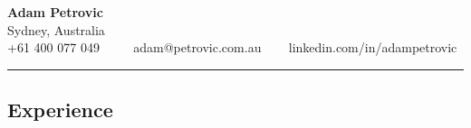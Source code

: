 \documentclass[11pt,letterpaper]{article}
\begin{document}
\begin{center}
	{\LARGE \textbf{Adam Petrovic}}\\
        \vspace{0.10cm}
	Sydney, Australia
	\vspace{0.20cm}
	\\
	\raisebox{-0.1\height} {\Large \faPhoneSquare} +61 400 077 049 \ \ \ \ \raisebox{-0.1\height}{\Large \faEnvelopeSquare} adam@petrovic.com.au \ \ \ \raisebox{-0.1\height}{\Large \faLinkedinSquare} linkedin.com/in/adampetrovic
\end{center}

\hrule
\vspace{-1em}
\subsection*{\Large Experience}
\end{document}
